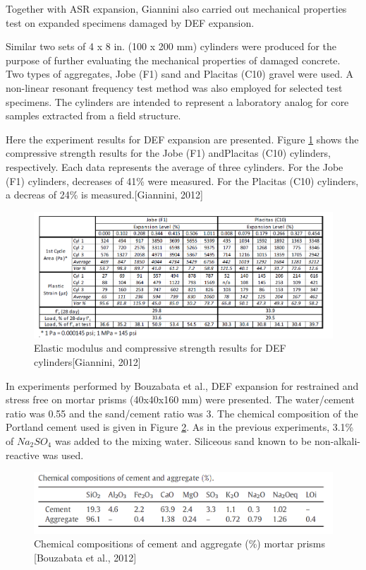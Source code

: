 \clearpage

Together with ASR expansion, Giannini\cite{GIANNINI} also carried out mechanical properties test on expanded specimens damaged by DEF expansion.

Similar two sets of 4 x 8 in. (100 x 200 mm) cylinders were produced for the purpose of further evaluating the mechanical properties of damaged concrete. Two types of aggregates, Jobe (F1) sand and Placitas (C10) gravel were used. A non-linear resonant frequency test method was also employed for selected test specimens. The cylinders are intended to represent a laboratory analog for core samples extracted from a field structure.

Here the experiment results for DEF expansion are presented. Figure \ref{Giannini, 2012 DEF} shows the compressive strength results for the Jobe (F1) andPlacitas (C10) cylinders, respectively. Each data represents the average of three cylinders. For the Jobe (F1) cylinders, decreases of 41\% were measured. For the Placitas (C10) cylinders, a decreas of 24\% is measured.[Giannini, 2012]

\begin{figure}[h!]
  \centering
  \includegraphics[width=0.8\linewidth]{Reference/GIANNINIDEF.png}
  \caption{Elastic modulus and compressive strength results for DEF cylinders[Giannini, 2012]}
  \label{Giannini, 2012 DEF}
\end{figure}

\clearpage

In experiments performed by Bouzabata et al.\cite{Bouzabata}, DEF expansion for restrained and stress free on mortar prisms (40x40x160 mm) were presented. The water/cement ratio was 0.55 and the sand/cement ratio was 3. The chemical composition of the Portland cement used is given in Figure \ref{Bouzabata (2012)1}. As in the previous experiments, 3.1\% of $Na_2SO_4$ was added to the mixing water. Siliceous sand known to be non-alkali-reactive was used.

\begin{figure}[h!]
  \centering
  \includegraphics[width=0.8\linewidth]{Reference/Bouzabata1.png}
  \caption{Chemical compositions of cement and aggregate (\%) mortar prisms [Bouzabata et al., 2012]}
  \label{Bouzabata (2012)1}
\end{figure}

